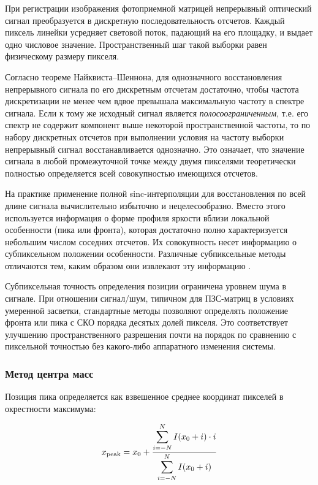 При регистрации изображения фотоприемной матрицей непрерывный оптический сигнал преобразуется в дискретную последовательность отсчетов. Каждый пиксель линейки усредняет световой поток, падающий на его площадку, и выдает одно числовое значение. Пространственный шаг такой выборки равен физическому размеру пикселя.

Согласно теореме Найквиста–Шеннона, для однозначного восстановления непрерывного сигнала по его дискретным отсчетам достаточно, чтобы частота дискретизации не менее чем вдвое превышала максимальную частоту в спектре сигнала. Если к тому же исходный сигнал является \textit{полосоограниченным}, т.е. его спектр не содержит компонент выше некоторой пространственной частоты, то по набору дискретных отсчетов при выполнении условия на частоту выборки непрерывный сигнал восстанавливается однозначно. Это означает, что значение сигнала в любой промежуточной точке между двумя пикселями теоретически полностью определяется всей совокупностью имеющихся отсчетов.

На практике применение полной sinc-интерполяции для восстановления по всей длине сигнала вычислительно избыточно и нецелесообразно. Вместо этого используется информация о форме профиля яркости вблизи локальной особенности (пика или фронта), которая достаточно полно характеризуется небольшим числом соседних отсчетов. Их совокупность несет информацию о субпиксельном положении особенности. Различные субпиксельные методы отличаются тем, каким образом они извлекают эту информацию \cite{blais_rioux_peak}.

Субпиксельная точность определения позиции ограничена уровнем шума в сигнале. При отношении сигнал/шум, типичном для ПЗС-матриц в условиях умеренной засветки, стандартные методы позволяют определять положение фронта или пика с СКО порядка десятых долей пикселя. Это соответствует улучшению пространственного разрешения почти на порядок по сравнению с пиксельной точностью без какого-либо аппаратного изменения системы.

\subsubsection{Метод центра масс \cite{blais_rioux_peak}}

Позиция пика определяется как взвешенное среднее координат пикселей в окрестности
максимума:

$$
x_{\rm peak} = x_0 + \frac{\displaystyle\sum_{i=-N}^{N} I(x_0 + i)\cdot i}{\displaystyle\sum_{i=-N}^{N} I(x_0 + i)}
$$

